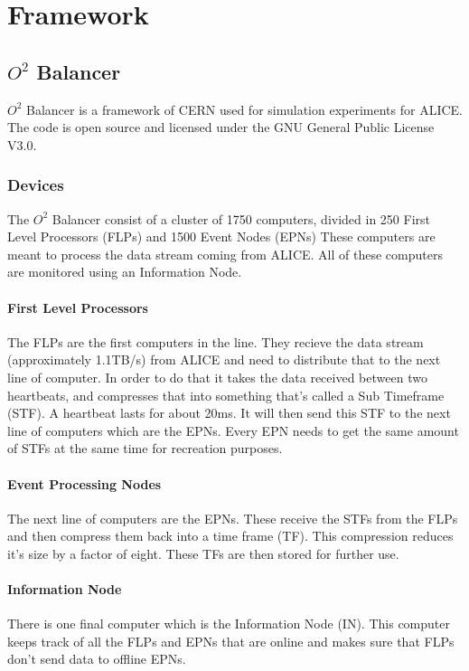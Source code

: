 \documentclass{report}
\begin{document}
\newpage

\chapter{Framework}

\section{$O^2$ Balancer}
$O^2$ Balancer is a framework of CERN used for simulation experiments for ALICE. The code is open source and licensed under the GNU General Public License V3.0.

\subsection{Devices}
The $O^2$ Balancer consist of a cluster of 1750 computers, divided in 250 First Level Processors (FLPs) and 1500 Event  Nodes (EPNs) These computers are meant to process the data stream coming from ALICE. All of these computers are monitored using an Information Node.

\subsubsection*{First Level Processors}
The FLPs are the first computers in the line. They recieve the data stream (approximately 1.1TB/s) from ALICE and need to distribute that to the next line of computer. In order to do that it takes the data received between two heartbeats, and compresses that into something that's called a Sub Timeframe (STF). A heartbeat lasts for about 20ms. It will then send this STF to the next line of computers which are the EPNs. Every EPN needs to get the same amount of STFs at the same time for recreation purposes.

\subsubsection*{Event Processing Nodes}
The next line of computers are the EPNs. These receive the STFs from the FLPs and then compress them back into a time frame (TF). This compression reduces it's size by a factor of eight. These TFs are then stored for further use.

\subsubsection*{Information Node}
There is one final computer which is the Information Node (IN). This computer keeps track of all the FLPs and EPNs that are online and makes sure that FLPs don't send data to offline EPNs.
\end{document}
